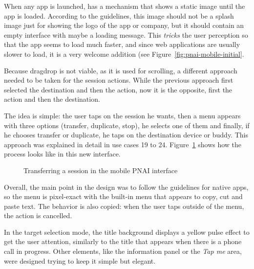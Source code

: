 When any app is launched,  has a mechanism that shows a static image until the app is loaded.
According to the guidelines, this image should not be a splash image just for showing the logo of the app or company, but it should contain an empty interface with maybe a loading message.
This \emph{tricks} the user perception so that the app seems to load much faster, and since web applications are usually slower to load, it is a very welcome addition (see Figure~\ref{fig:pnai-mobile-initial}.

Because drag\et{}drop is not viable, as it is used for scrolling, a different approach needed to be taken for the session actions.
While the previous approach first selected the destination and then the action, now it is the opposite, first the action and then the destination.

The idea is simple: the user taps on the session he wants, then a menu appears with three options (transfer, duplicate, stop), he selects one of them and finally, if he chooses transfer or duplicate, he taps on the destination device or buddy.
This approach was explained in detail in use cases 19 to 24.
Figure~\ref{fig:pnai-mobile-transfer} shows how the process looks like in this new interface.

\begin{figure}[htbp]
  \centering
  \caption{Transferring a session in the mobile PNAI interface}
  \label{fig:pnai-mobile-transfer}
\end{figure}

Overall, the main point in the design was to follow the  guidelines for native apps, so the menu is pixel-exact with the built-in menu that appears to copy, cut and paste text.
The behavior is also copied: when the user taps outside of the menu, the action is cancelled.

In the target selection mode, the title background displays a yellow pulse effect to get the user attention, similarly to the title that appears when there is a phone call in progress.
Other elements, like the information panel or the \emph{Tap me} area, were designed trying to keep it simple but elegant.

